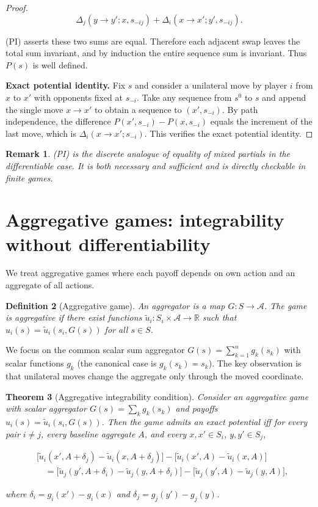 \documentclass[11pt]{article}
\newtheorem{theorem}{Theorem}[section]
\newtheorem{definition}[theorem]{Definition}
\newtheorem{remark}[theorem]{Remark}
\begin{document}
\begin{proof}
\[
\Delta_j(y\to y'; x, s_{-ij}) + \Delta_i(x\to x'; y', s_{-ij}).
\]


(PI) asserts these two sums are equal. Therefore each adjacent swap leaves
the total sum invariant, and by induction the entire sequence sum is
invariant. Thus \(P(s)\) is well defined.

\textbf{Exact potential identity.} Fix \(s\) and consider a unilateral move
by player \(i\) from \(x\) to \(x'\) with opponents fixed at \(s_{-i}\).
Take any sequence from \(s^0\) to \(s\) and append the single move
\(x\to x'\) to obtain a sequence to \((x',s_{-i})\). By path independence,
the difference \(P(x',s_{-i})-P(x,s_{-i})\) equals the increment of the last
move, which is \(\Delta_i(x\to x'; s_{-i})\). This verifies the exact
potential identity.

\end{proof}

\begin{remark}
(PI) is the discrete analogue of equality of mixed partials in the
differentiable case. It is both necessary and sufficient and is directly
checkable in finite games.
\end{remark}

\section{Aggregative games: integrability without differentiability}
We treat aggregative games where each payoff depends on own action and an
aggregate of all actions.

\begin{definition}[Aggregative game]
An aggregator is a map \(G:S\to\mathcal A\). The game is \emph{aggregative}
if there exist functions \(\tilde u_i:S_i\times\mathcal A\to\mathbb R\) such
that \(u_i(s)=\tilde u_i(s_i,G(s))\) for all \(s\in S\).
\end{definition}

We focus on the common scalar sum aggregator \(G(s)=\sum_{k=1}^n g_k(s_k)\)
with scalar functions \(g_k\) (the canonical case is \(g_k(s_k)=s_k\)). The
key observation is that unilateral moves change the aggregate only through
the moved coordinate.

\begin{theorem}[Aggregative integrability condition]
\label{thm:agg}
Consider an aggregative game with scalar aggregator \(G(s)=\sum_k g_k(s_k)\)
and payoffs \(u_i(s)=\tilde u_i(s_i,G(s))\). Then the game admits an exact
potential iff for every pair \(i\ne j\), every baseline aggregate \(A\), and
every \(x,x'\in S_i\), \(y,y'\in S_j\),


\[
\begin{aligned}
&\big[\tilde u_i(x',A+\delta_j)-\tilde u_i(x,A+\delta_j)\big]-\big[\tilde u_i(x',A)-\tilde u_i(x,A)\big]\\
&\quad=\big[\tilde u_j(y',A+\delta_i)-\tilde u_j(y,A+\delta_i)\big]-\big[\tilde u_j(y',A)-\tilde u_j(y,A)\big],
\end{aligned}
\tag{AGG-PI}
\]


where \(\delta_i=g_i(x')-g_i(x)\) and \(\delta_j=g_j(y')-g_j(y)\).
\end{theorem}
\end{document}
